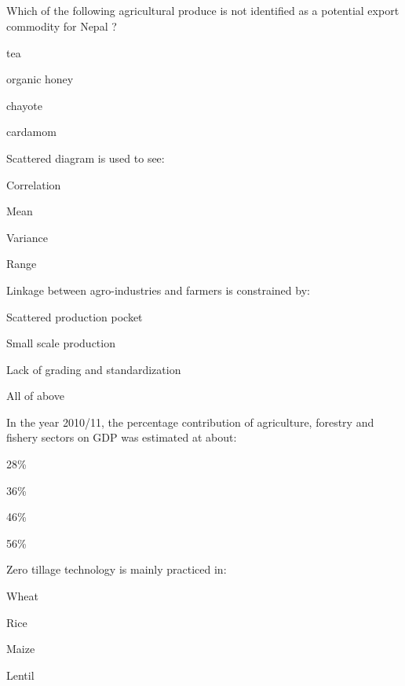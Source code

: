 
\subsection*{}

\begin{questions}

\question Which of the following agricultural produce is not identified as a potential export commodity for Nepal ?
  \begin{items}
  \item tea
  \item organic honey
  \item chayote
  \item cardamom
  \end{items}

\question Scattered diagram is used to see:
  \begin{items}
  \item Correlation
  \item Mean
  \item Variance
  \item Range
  \end{items}

\question Linkage between agro-industries and farmers is constrained by:
  \begin{items}
  \item Scattered production pocket
  \item Small scale production
  \item Lack of grading and standardization
  \item All of above
  \end{items}

\question In the year 2010/11, the percentage contribution of agriculture, forestry and fishery sectors on GDP was estimated at about:
  \begin{items}
  \item 28\%
  \item 36\%
  \item 46\%
  \item 56\%
  \end{items}

\question Zero tillage technology is mainly practiced in:
  \begin{items}
  \item Wheat
  \item Rice
  \item Maize
  \item Lentil
  \end{items}


\end{questions}
